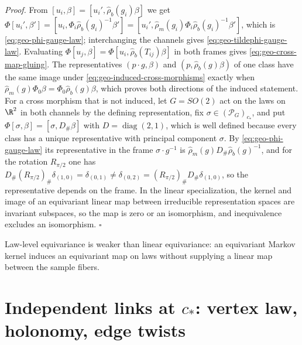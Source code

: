 \noindent\emph{Proof.}
From $[u_i,\beta]=[u_i',\widehat\rho_b(g_i)\beta]$ we get
$\Phi[u_i',\beta']=[u_i,\Phi_i\widehat\rho_b(g_i)^{-1}\beta']=[u_i',\widehat\rho_m(g_i)\Phi_i\widehat\rho_b(g_i)^{-1}\beta']$,
which is \eqref{eq:geo-phi-gauge-law}; interchanging the channels gives
\eqref{eq:geo-tildephi-gauge-law}. Evaluating $\Phi[u_j,\beta]=\Phi[u_i,\widehat\rho_b(T_{ij})\beta]$
in both frames gives \eqref{eq:geo-cross-map-gluing}. The representatives $(p\cdot g,\beta)$ and
$(p,\widehat\rho_b(g)\beta)$ of one class have the same image under
\eqref{eq:geo-induced-cross-morphisms} exactly when $\widehat\rho_m(g)\Phi_0\beta=\Phi_0\widehat\rho_b(g)\beta$,
which proves both directions of the induced statement. For a cross morphism that is not induced, let
$G=SO(2)$ act on the laws on $\R^2$ in both channels by the defining representation, fix
$\sigma\in(\mathscr P_G)_{c_*}$, and put $\Phi[\sigma,\beta]=[\sigma,D_\#\beta]$ with
$D=\operatorname{diag}(2,1)$, which is well defined because every class has a unique representative
with principal component $\sigma$. By \eqref{eq:geo-phi-gauge-law} its representative in the frame
$\sigma\cdot g^{-1}$ is $\widehat\rho_m(g)D_\#\widehat\rho_b(g)^{-1}$, and for the rotation $R_{\pi/2}$
one has $D_\#(R_{\pi/2})_\#\delta_{(1,0)}=\delta_{(0,1)}\neq\delta_{(0,2)}=(R_{\pi/2})_\#D_\#\delta_{(1,0)}$,
so the representative depends on the frame. In the linear specialization, the kernel and image of an
equivariant linear map between irreducible representation spaces are invariant subspaces, so the map is
zero or an isomorphism, and inequivalence excludes an isomorphism. \hfill$\square$

Law-level equivariance is weaker than linear equivariance: an equivariant Markov kernel induces an
equivariant map on laws without supplying a linear map between the sample fibers.

\section{Independent links at \texorpdfstring{$c_*$}{c*}: vertex law, holonomy, edge twists}
\label{sec:geo-regime-two}
\label{sec:geo-trivializing}
\label{sec:phil-agreements}


